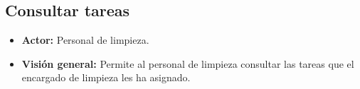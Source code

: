 \documentclass[spanish,a4paper,12pt]{report}	%
\begin{document}

	\hspace{0.7 true cm}
	\subsection{Consultar tareas}				
			\begin{itemize}
				\item \textbf{Actor: } Personal de limpieza.
				\item \textbf{Visión general: } Permite al personal de limpieza consultar las tareas que el encargado de limpieza les ha asignado. 		
			\end {itemize}


	
\end{document}
